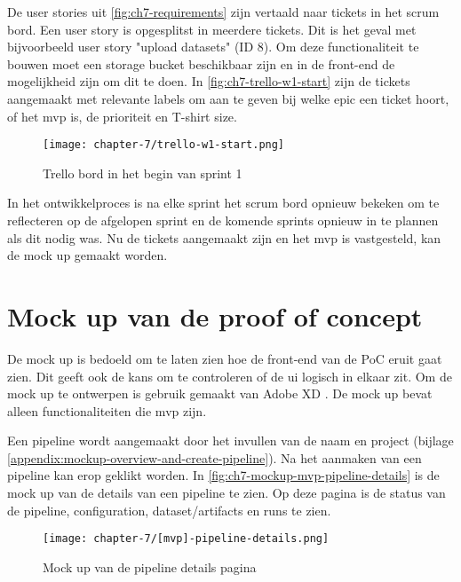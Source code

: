 De user stories uit \autoref{fig:ch7-requirements} zijn vertaald naar tickets in het scrum bord. Een user story is opgesplitst in meerdere tickets. Dit is het geval met bijvoorbeeld user story \string"upload datasets\string" (ID 8). Om deze functionaliteit te bouwen moet een storage bucket beschikbaar zijn en in de front-end de mogelijkheid zijn om dit te doen. In \autoref{fig:ch7-trello-w1-start} zijn de tickets aangemaakt met relevante labels om aan te geven bij welke epic een ticket hoort, of het \acrshort{mvp} is, de prioriteit en T-shirt size.

\begin{figure}[hbt!]
  \centering
  \texttt{[image: chapter-7/trello-w1-start.png]}
  \caption{Trello bord in het begin van sprint 1}
  \label{fig:ch7-trello-w1-start}
\end{figure}

In het ontwikkelproces is na elke sprint het scrum bord opnieuw bekeken om te reflecteren op de afgelopen sprint en de komende sprints opnieuw in te plannen als dit nodig was. Nu de tickets aangemaakt zijn en het \acrshort{mvp} is vastgesteld, kan de mock up gemaakt worden.

\section{Mock up van de proof of concept}\label{sec:ch7-mock-up-van-de-proof-of-concept}
De mock up is bedoeld om te laten zien hoe de front-end van de PoC eruit gaat zien. Dit geeft ook de kans om te controleren of de \acrfull{ui} logisch in elkaar zit. Om de mock up te ontwerpen is gebruik gemaakt van Adobe XD \cite{adobe-xd}. De mock up bevat alleen functionaliteiten die \acrshort{mvp} zijn. 

Een pipeline wordt aangemaakt door het invullen van de naam en project (bijlage \ref{appendix:mockup-overview-and-create-pipeline}). Na het aanmaken van een pipeline kan erop geklikt worden. In \autoref{fig:ch7-mockup-mvp-pipeline-details} is de mock up van de details van een pipeline te zien. Op deze pagina is de status van de pipeline, configuration, dataset/\glspl{artifact} en runs te zien.

\begin{figure}[hbt!]
  \centering
  \texttt{[image: chapter-7/[mvp]-pipeline-details.png]}
  \caption{Mock up van de pipeline details pagina}
  \label{fig:ch7-mockup-mvp-pipeline-details}
\end{figure}

